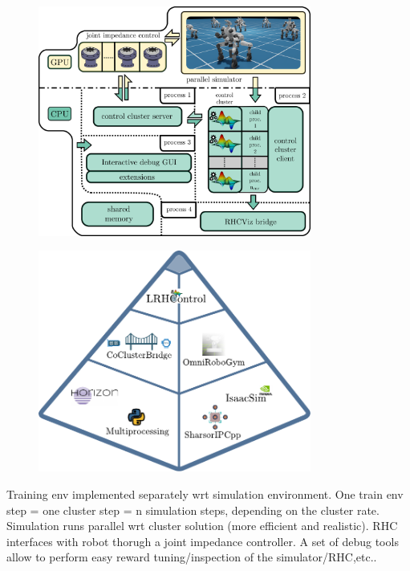 \begin{Large}
	\vskip1cm
	\begin{figure}[h]
		\includegraphics[width=0.8\textwidth]{docs/imgs/cocluster_arch_full.pdf}
	\end{figure}
	\begin{figure}[h]
		\includegraphics[width=0.8\textwidth]{docs/imgs/ecosystem.pdf}
	\end{figure}
	Training env implemented separately wrt simulation environment. One train env step = one cluster step = n simulation steps, depending on the cluster rate.
	Simulation runs parallel wrt cluster solution (more efficient and realistic).
	RHC interfaces with robot thorugh a joint impedance controller. A set of debug tools allow to perform easy reward tuning/inspection of the simulator/RHC,etc..
\end{Large}